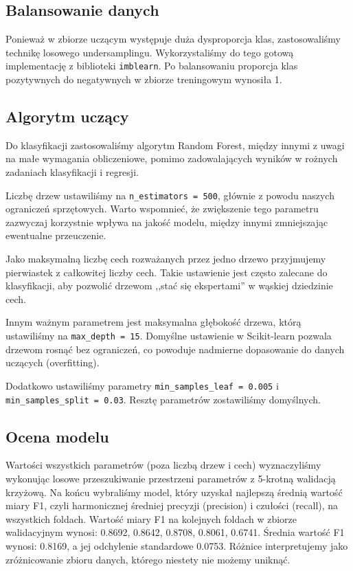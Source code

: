 \documentclass[11pt]{article}
\def\code#1{\texttt{#1}}
\begin{document}
\subsection{Balansowanie danych}

Ponieważ w zbiorze uczącym występuje duża dysproporcja klas,
zastosowaliśmy technikę losowego undersamplingu.
Wykorzystaliśmy do tego gotową implementację z biblioteki \code{imblearn}.
Po balansowaniu proporcja klas pozytywnych do negatywnych w zbiorze treningowym wynosiła 1.

\subsection{Algorytm uczący}

Do klasyfikacji zastosowaliśmy algorytm Random Forest,
między innymi z uwagi na małe wymagania obliczeniowe,
pomimo zadowalających wyników w rożnych zadaniach klasyfikacji i regresji.

Liczbę drzew ustawiliśmy na \code{n\_estimators = 500}, głównie z powodu naszych ograniczeń sprzętowych.
Warto wspomnieć, że zwiększenie tego parametru zazwyczaj korzystnie wpływa na jakość modelu,
między innymi zmniejszając ewentualne przeuczenie.

Jako maksymalną liczbę cech rozważanych przez jedno drzewo przyjmujemy pierwiastek z całkowitej liczby cech.
Takie ustawienie jest często zalecane do klasyfikacji,
aby pozwolić drzewom ,,stać się ekspertami'' w wąskiej dziedzinie cech.

Innym ważnym parametrem jest maksymalna głębokość drzewa, którą ustawiliśmy na \code{max\_depth = 15}.
Domyślne ustawienie w Scikit-learn pozwala drzewom rosnąć bez ograniczeń,
co powoduje nadmierne dopasowanie do danych uczących (overfitting).

Dodatkowo ustawiliśmy parametry \code{min\_samples\_leaf = 0.005} i \code{min\_samples\_split = 0.03}.
Resztę parametrów zostawiliśmy domyślnych.

\subsection{Ocena modelu}

Wartości wszystkich parametrów (poza liczbą drzew i cech) wyznaczyliśmy wykonując
losowe przeszukiwanie przestrzeni parametrów z 5-krotną walidacją krzyżową.
Na końcu wybraliśmy model, który uzyskał najlepszą średnią wartość miary F1,
czyli harmonicznej średniej precyzji (precision) i czułości (recall),
na wszystkich foldach.
Wartość miary F1 na kolejnych foldach w zbiorze walidacyjnym wynosi: 0.8692, 0.8642, 0.8708, 0.8061, 0.6741.
Średnia wartość F1 wynosi: 0.8169, a jej odchylenie standardowe 0.0753.
Różnice interpretujemy jako zróżnicowanie zbioru danych, którego niestety nie możemy uniknąć.
\end{document}
